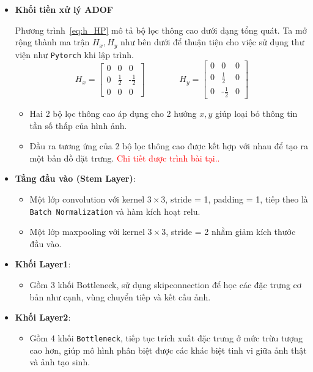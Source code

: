\begin{itemize}
	\item \textbf{Khối tiền xử lý ADOF}
	
	Phương trình~\eqref{eq:h_HP} mô tả bộ lọc thông cao dưới dạng tổng quát. Ta mở rộng thành ma trận $H_x, H_y$ như bên dưới để thuận tiện cho việc sử dụng thư viện như \texttt{Pytorch} khi lập trình.
	\[
		H_x = \begin{bmatrix}
			0 & 0 & 0 \\
			0 & \tfrac{1}{2} &  \text{-}\tfrac{1}{2} \\
			0 & 0 & 0
		\end{bmatrix} \qquad \qquad
		H_y = \begin{bmatrix}
			0 & 0 & 0 \\
			0 & \tfrac{1}{2} &  0 \\
			0 & \text{-}\tfrac{1}{2} & 0
		\end{bmatrix}
	\]
	
	\begin{itemize}
		\item Hai 2 bộ lọc thông cao áp dụng cho 2 hướng $x, y$ giúp loại bỏ thông tin tần số thấp của hình ảnh.
		\item Đầu ra tương ứng của 2 bộ lọc thông cao được kết hợp với nhau để tạo ra một bản đồ đặt trưng. \textcolor{red}{Chi tiết được trình bài tại..}
	\end{itemize}
	\item \textbf{Tầng đầu vào (Stem Layer)}:
	\begin{itemize}
		\item Một lớp \gls{convolution} với \gls{kernel} \(3 \times 3\), \gls{stride} = 1, \gls{padding} = 1, tiếp theo là \texttt{Batch Normalization} và hàm kích hoạt \gls{relu}.
		\item Một lớp \gls{maxpooling} với \gls{kernel} \(3 \times 3\), \gls{stride} = 2 nhằm giảm kích thước đầu vào.
	\end{itemize}
	
	\item \textbf{Khối Layer1}:
	\begin{itemize}
		\item Gồm 3 khối Bottleneck, sử dụng \gls{skipconnection} để học các đặc trưng cơ bản như cạnh, vùng chuyển tiếp và kết cấu ảnh.
	\end{itemize}
	
	\item \textbf{Khối Layer2}:
	\begin{itemize}
		\item Gồm 4 khối \texttt{Bottleneck}, tiếp tục trích xuất đặc trưng ở mức trừu tượng cao hơn, giúp mô hình phân biệt được các khác biệt tinh vi giữa ảnh thật và ảnh tạo sinh.
	\end{itemize}
	

\end{itemize}
